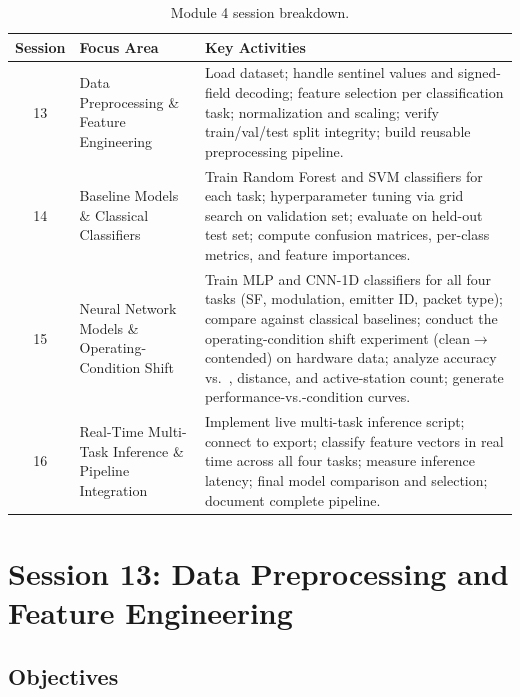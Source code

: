 \documentclass[11pt,letterpaper]{article}
\begin{document}
	\begin{table}[ht!]
		\centering
		\caption{Module 4 session breakdown.}
		\label{tab:schedule}
		\renewcommand{\arraystretch}{1.4}
		\begin{tabularx}{\textwidth}{c l X}
			\toprule
			\textbf{Session} & \textbf{Focus Area} & \textbf{Key Activities} \\
			\midrule
			13 & Data Preprocessing \& Feature Engineering &
			Load dataset; handle sentinel values and signed-field decoding; feature selection per classification task; normalization and scaling; verify train/val/test split integrity; build reusable preprocessing pipeline. \\
			14 & Baseline Models \& Classical Classifiers &
			Train Random Forest and SVM classifiers for each task; hyperparameter tuning via grid search on validation set; evaluate on held-out test set; compute confusion matrices, per-class metrics, and feature importances. \\
			15 & Neural Network Models \& Operating-Condition Shift &
			Train MLP and CNN-1D classifiers for all four tasks (SF, modulation, emitter ID, packet type); compare against classical baselines; conduct the operating-condition shift experiment (clean$\to$contended) on hardware data; analyze accuracy vs.\ \SNR{}, distance, and active-station count; generate performance-vs.-condition curves. \\
			16 & Real-Time Multi-Task Inference \& Pipeline Integration &
			Implement live multi-task inference script; connect to \FPGA{} \UART{} export; classify feature vectors in real time across all four tasks; measure inference latency; final model comparison and selection; document complete \ML{} pipeline. \\
			\bottomrule
		\end{tabularx}
	\end{table}

	\newpage
	\section{Session 13: Data Preprocessing and Feature Engineering}
	\label{sec:preprocessing}

	\subsection{Objectives}
\end{document}
